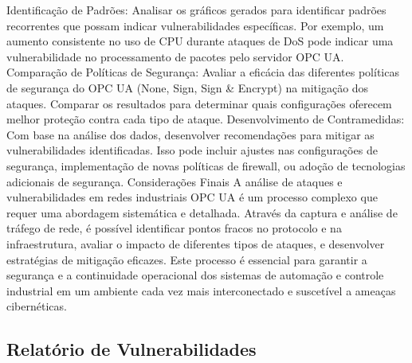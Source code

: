 {    Identificação de Padrões: Analisar os gráficos gerados para identificar padrões recorrentes que possam indicar vulnerabilidades específicas. Por exemplo, um aumento consistente no uso de CPU durante ataques de DoS pode indicar uma vulnerabilidade no processamento de pacotes pelo servidor OPC UA.
    Comparação de Políticas de Segurança: Avaliar a eficácia das diferentes políticas de segurança do OPC UA (None, Sign, Sign \& Encrypt) na mitigação dos ataques. Comparar os resultados para determinar quais configurações oferecem melhor proteção contra cada tipo de ataque.
    Desenvolvimento de Contramedidas: Com base na análise dos dados, desenvolver recomendações para mitigar as vulnerabilidades identificadas. Isso pode incluir ajustes nas configurações de segurança, implementação de novas políticas de firewall, ou adoção de tecnologias adicionais de segurança.
    Considerações Finais
    A análise de ataques e vulnerabilidades em redes industriais OPC UA é um processo complexo que requer uma abordagem sistemática e detalhada. Através da captura e análise de tráfego de rede, é possível identificar pontos fracos no protocolo e na infraestrutura, avaliar o impacto de diferentes tipos de ataques, e desenvolver estratégias de mitigação eficazes. Este processo é essencial para garantir a segurança e a continuidade operacional dos sistemas de automação e controle industrial em um ambiente cada vez mais interconectado e suscetível a ameaças cibernéticas.
    }

    \subsection{Relatório de Vulnerabilidades}

